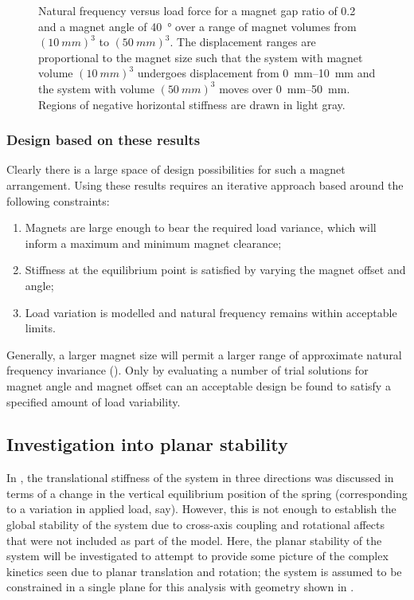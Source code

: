 \documentclass[11pt,a4paper]{memoir}
\begin{document}
\begin{figure}
\centering
{}
\caption{Natural frequency versus load force for a magnet gap ratio of \num{0.2} and a magnet angle of \SI{40}{\degree} over a range of magnet volumes from $(\SI{10}{mm})^3$ to $(\SI{50}{mm})^3$.
The displacement ranges are proportional to the magnet size such that the system with magnet volume $(\SI{10}{mm})^3$ undergoes displacement from \SIrange{0}{10}{mm} and the system with volume $(\SI{50}{mm})^3$ moves over \SIrange{0}{50}{mm}.
Regions of negative horizontal stiffness are drawn in light gray.}
\end{figure}

\subsubsection{Design based on these results}

Clearly there is a large space of design possibilities for such a magnet arrangement.
Using these results requires an iterative approach based around the following constraints:
\begin{enumerate}
\item Magnets are large enough to bear the required load variance, which will inform a maximum and minimum magnet clearance;
\item Stiffness at the equilibrium point is satisfied by varying the magnet offset and angle;
\item Load variation is modelled and natural frequency remains within acceptable limits.
\end{enumerate}
Generally, a larger magnet size will permit a larger range of approximate natural frequency invariance ().
Only by evaluating a number of trial solutions for magnet angle and magnet offset can an acceptable design be found to satisfy a specified amount of load variability.



\subsection{Investigation into planar stability}

In , the translational stiffness of the system in three directions was discussed in terms of a change in the vertical equilibrium position of the spring (corresponding to a variation in applied load, say).
However, this is not enough to establish the global stability of the system due to cross-axis coupling and rotational affects that were not included as part of the model.
Here, the planar stability of the system will be investigated to attempt to provide some picture of the complex kinetics seen due to planar translation and rotation; the system is assumed to be constrained in a single plane for this analysis with geometry shown in .
\end{document}
